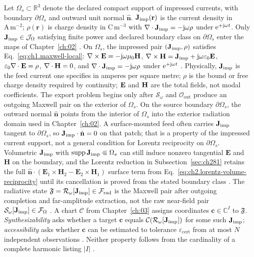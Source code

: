 Let $\Omega_s\subset\mathbb{R}^{3}$ denote the declared compact support of impressed currents, with
boundary $\partial\Omega_s$ and outward unit normal $\hat{\mathbf{n}}$.
$\mathbf{J}_{\mathrm{imp}}(\mathbf{r})$ is the current density in $\mathrm{A\,m^{-2}}$; $\rho(\mathbf{r})$ is charge density
in $\mathrm{C\,m^{-3}}$ with $\nabla\cdot\mathbf{J}_{\mathrm{imp}}=-\mathrm{j}\omega\rho$ under $\mathrm{e}^{+\mathrm{j}\omega t}$.
Only $\mathbf{J}_{\mathrm{imp}}\in\mathcal{J}_\Omega$ satisfying finite power and declared boundary class on $\partial\Omega_s$
enter the maps of Chapter~\ref{ch:02} \cite{stratton1941}.
On $\Omega_s$, the impressed pair $(\mathbf{J}_{\mathrm{imp}},\rho)$ satisfies Eq.~\eqref{eq:ch1.maxwell-local}:
$\nabla\times\mathbf{E}=-\mathrm{j}\omega\mu_0\mathbf{H}$, $\nabla\times\mathbf{H}=\mathbf{J}_{\mathrm{imp}}+\mathrm{j}\omega\varepsilon_0\mathbf{E}$, $\varepsilon_0\nabla\cdot\mathbf{E}=\rho$,
$\nabla\cdot\mathbf{H}=0$, and $\nabla\cdot\mathbf{J}_{\mathrm{imp}}=-\mathrm{j}\omega\rho$ under $\mathrm{e}^{+\mathrm{j}\omega t}$ \cite{stratton1941}.
Physically, $\mathbf{J}_{\mathrm{imp}}$ is the feed current one specifies in amperes per square metre; $\rho$ is the bound or free
charge density required by continuity; $\mathbf{E}$ and $\mathbf{H}$ are the total fields, not modal coefficients.
The export problem begins only after $\mathcal{S}_\omega$ and $\mathcal{O}_{\mathrm{out}}$ produce an outgoing
Maxwell pair on the exterior of $\Omega_s$.
On the source boundary $\partial\Omega_s$, the outward normal $\hat{\mathbf{n}}$ points from the interior of
$\Omega_s$ into the exterior radiation domain used in Chapter~\ref{ch:02}.
A surface-mounted feed often carries $\mathbf{J}_{\mathrm{imp}}$ tangent to $\partial\Omega_s$, so $\mathbf{J}_{\mathrm{imp}}\cdot\hat{\mathbf{n}}=0$ on
that patch; that is a property of the impressed current support, not a general condition for Lorentz reciprocity on
$\partial\Omega_s$. Volumetric $\mathbf{J}_{\mathrm{imp}}$ with $\operatorname{supp}\mathbf{J}_{\mathrm{imp}}\Subset\Omega_s$ can still induce nonzero
tangential $\mathbf{E}$ and $\mathbf{H}$ on the boundary, and the Lorentz reduction in Subsection~\ref{sec:ch281}
retains the full $\hat{\mathbf{n}}\cdot(\mathbf{E}_{1}\times\mathbf{H}_{2}-\mathbf{E}_{2}\times\mathbf{H}_{1})$ surface
term from Eq.~\eqref{eq:ch2.lorentz-volume-reciprocity} until its cancellation is proved from the stated boundary class
\cite{stratton1941,collin2001}.
The radiative state $\mathfrak{F}=\mathcal{R}_\omega[\mathbf{J}_{\mathrm{imp}}]\in\mathcal{F}_{\mathrm{rad}}$ is the
Maxwell pair after outgoing completion and far-amplitude extraction, not the raw near-field pair
$\mathcal{S}_\omega[\mathbf{J}_{\mathrm{imp}}]\in\mathcal{F}_\Omega$ \cite{harrington2001}.
A chart $\mathcal{C}$ from Chapter~\ref{ch:03} assigns coordinates $\mathbf{c}\in\mathbb{C}^{I}$ to
$\mathfrak{F}$.
\emph{Synthesizability} asks whether a target $\mathbf{c}$ equals $\mathcal{C}(\mathcal{R}_\omega[\mathbf{J}_{\mathrm{imp}}])$ for
some such $\mathbf{J}_{\mathrm{imp}}$; \emph{accessibility} asks whether $\mathbf{c}$ can be estimated to tolerance
$\varepsilon_{\mathrm{cert}}$ from at most $N$ independent observations \cite{stratton1941,devaney2004}.
Neither property follows from the cardinality of a complete harmonic listing $|I|$ \cite{chu1948}.

